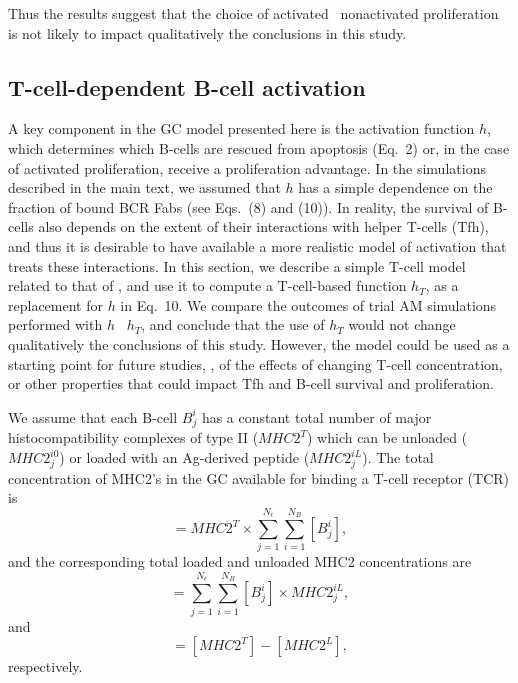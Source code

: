 Thus the results suggest that the choice of activated \vs~nonactivated
proliferation is not likely to impact qualitatively the conclusions in this study.

\vspace{1EM}
\subsection{T-cell-dependent B-cell activation}
\label{sec:tcell}
A key component in the GC model presented here is the activation function
$h$, which determines which B-cells are rescued from apoptosis (Eq.~2)
or, in the case of activated proliferation, receive a proliferation advantage.
%
In the simulations described in the main text, we assumed that $h$ has a
simple dependence on the fraction of bound BCR Fabs (see
Eqs.~(8) and (10)). In reality, the survival of B-cells also depends on
the extent of their interactions with helper T-cells
(Tfh),\cite{liu89,allen07,crotty14} and thus it is desirable to have available a more realistic model of
activation that treats these interactions. In this
section, we describe a simple T-cell model related to that of \citet{mayer19}, and use it to compute a T-cell-based
function $h_T$, as a replacement for $h$ in Eq.~10. We
compare the outcomes of trial AM simulations performed with $h$
\vs~$h_T$, and conclude that the use of $h_T$ would not change
qualitatively the conclusions of this study. However, the model could be
used as a starting point for future studies, \eg, of the effects of changing T-cell
concentration, or other properties that could impact Tfh and B-cell
survival and proliferation.

We assume that each B-cell $B^i_j$ has a constant total number of major
histocompatibility complexes of type II ($MHC2^T$) which can be
unloaded ($MHC2^{i0}_j$) or loaded with an Ag-derived peptide ($MHC2^{iL}_j$).
The total concentration of MHC2's in the GC available for binding a T-cell receptor (TCR) is 
\begin{equation}
 [MHC2^T] =MHC2^T\times \sum_{j=1}^{N_\epsilon}\sum_{i=1}^{N_B}[B_j^i],
\end{equation}
and the corresponding total loaded and unloaded MHC2 concentrations are
\begin{equation}
 [MHC2^L]=\sum_{j=1}^{N_\epsilon}\sum_{i=1}^{N_B}[B_j^i] \times MHC2^{iL}_j,
\end{equation}
 and
\begin{equation}
 [MHC2^0]=[MHC2^T]-[MHC2^L],
\end{equation}
respectively.

